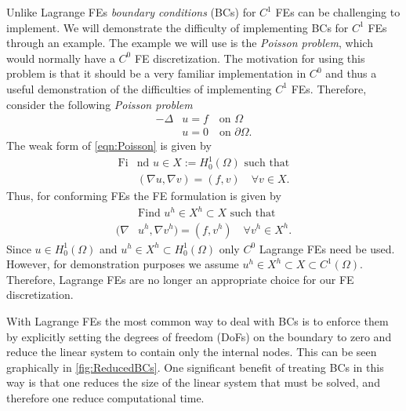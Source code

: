 Unlike Lagrange FEs \emph{boundary conditions} (BCs) for $C^1$ FEs can be
challenging to implement. We will demonstrate the difficulty of implementing BCs for
$C^1$ FEs through an example. The example we will use is the \emph{Poisson
problem}, which would normally have a $C^0$ FE discretization. The motivation
for using this problem is that it should be a very familiar implementation in
$C^0$ and thus a useful demonstration of the difficulties of implementing
$C^1$ FEs. Therefore, consider the following \emph{Poisson problem}
\begin{equation}
  \begin{split}
    -\Delta &u = f \quad \text{on } \Omega \\
    &u = 0 \quad \text{on } \partial \Omega.
  \end{split}
  \label{eqn:Poisson}
\end{equation}
The weak form of \eqref{eqn:Poisson} is given by
\begin{equation}
  \begin{split}
    \text{Fi}&\text{nd }u \in X := H^1_0(\Omega) \text{ such that} \\
    &(\nabla u, \nabla v) = (f, v) \quad \forall v \in X.
  \end{split}
  \label{eqn:PoissonWeak}
\end{equation}
Thus, for conforming FEs the FE formulation is given by
\begin{equation}
  \begin{split}
    &\text{Find }u^h \in X^h \subset X \text{ such that} \\
    (\nabla &u^h, \nabla v^h) = (f, v^h) \quad \forall v^h \in X^h.
  \end{split}
  \label{eqn:PoissonFE}
\end{equation}
Since $u \in H^1_0(\Omega)$ and $u^h \in X^h \subset H^1_0(\Omega)$ only $C^0$
Lagrange FEs need be used. However, for demonstration purposes we assume $u^h
\in X^h \subset X \subset C^1(\Omega)$. Therefore, Lagrange FEs are no longer
an appropriate choice for our FE discretization.

With Lagrange FEs the most common way to deal with BCs is to enforce them by
explicitly setting the degrees of freedom (DoFs) on the boundary to zero and
reduce the linear system to contain only the internal nodes. This can be seen
graphically in \autoref{fig:ReducedBCs}. One significant benefit of treating BCs in
this way is that one reduces the size of the linear system that must be solved, and
therefore one reduce computational time.

